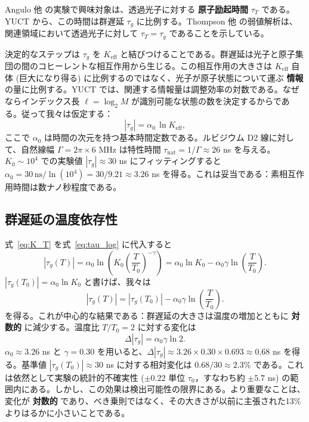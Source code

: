 \documentclass[12pt,a4paper]{article}
\newcommand{\Keff}{K_{\mathrm{eff}}}
\begin{document}
	Angulo 他 \cite{Angulo2024} の実験で興味対象は、透過光子に対する \textbf{原子励起時間} \(\tau_T\) である。YUCT から、この時間は群遅延 \(\tau_g\) に比例する。Thompson 他 \cite{Thompson2023} の弱値解析は、関連領域において透過光子に対して \(\tau_T = \tau_g\) であることを示している。
	
	決定的なステップは \(\tau_g\) を \(\Keff\) と結びつけることである。群遅延は光子と原子集団の間のコヒーレントな相互作用から生じる。この相互作用の大きさは \(\Keff\) 自体 (巨大になり得る) に比例するのではなく、光子が原子状態について運ぶ \textbf{情報} の量に比例する。YUCT では、関連する情報量は調整効率の対数である。なぜならインデックス長 \(\ell = \log_2 M\) が識別可能な状態の数を決定するからである。従って我々は仮定する：
	\begin{equation}
		|\tau_g| = \alpha_0 \, \ln\Keff,
		\label{eq:tau_log}
	\end{equation}
	ここで \(\alpha_0\) は時間の次元を持つ基本時間定数である。ルビジウム D2 線に対して、自然線幅 \(\Gamma = 2\pi \times 6\) MHz は特性時間 \(\tau_{\text{nat}} = 1/\Gamma \approx 26\) ns を与える。\(K_0 \sim 10^4\) での実験値 \(|\tau_g| \approx 30\) ns にフィッティングすると \(\alpha_0 = 30\,\text{ns} / \ln(10^4) = 30 / 9.21 \approx 3.26\) ns を得る。これは妥当である：素相互作用時間は数ナノ秒程度である。
	
	\subsection{群遅延の温度依存性}
	
	式~\eqref{eq:K_T} を式~\eqref{eq:tau_log} に代入すると
	\begin{equation}
		|\tau_g(T)| = \alpha_0 \ln\!\left(K_0 \left(\frac{T}{T_0}\right)^{-\gamma}\right)
		= \alpha_0 \ln K_0 - \alpha_0 \gamma \ln\!\left(\frac{T}{T_0}\right).
	\end{equation}
	\(|\tau_g(T_0)| = \alpha_0 \ln K_0\) と書けば、我々は
	\begin{equation}
		|\tau_g(T)| = |\tau_g(T_0)| - \alpha_0 \gamma \ln\!\left(\frac{T}{T_0}\right).
		\label{eq:tau_T_log}
	\end{equation}
	を得る。これが中心的な結果である：群遅延の大きさは温度の増加とともに \textbf{対数的} に減少する。温度比 \(T/T_0 = 2\) に対する変化は
	\begin{equation}
		\Delta |\tau_g| = \alpha_0 \gamma \ln 2.
	\end{equation}
	\(\alpha_0 \approx 3.26\) ns と \(\gamma = 0.30\) を用いると、\(\Delta |\tau_g| \approx 3.26 \times 0.30 \times 0.693 \approx 0.68\) ns を得る。基準値 \(|\tau_g(T_0)| \approx 30\) ns に対する相対変化は \(0.68 / 30 \approx 2.3\%\) である。これは依然として実験の統計的不確実性 (\(\pm 0.22\) 単位 \(\tau_0\)，すなわち約 \(\pm 5.7\) ns) の範囲内にある。しかし、この効果は検出可能性の限界にある。より重要なことは、変化が \textbf{対数的} であり、べき乗則ではなく、その大きさが以前に主張された13\%よりはるかに小さいことである。
	
\end{document}
